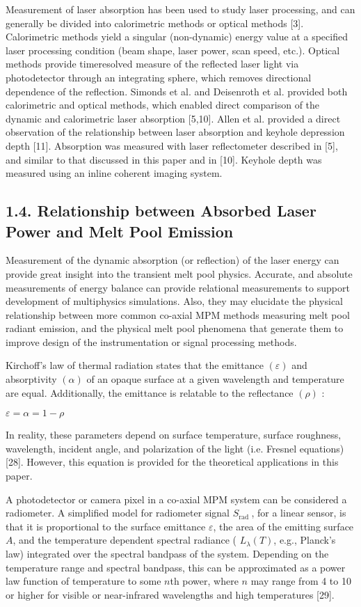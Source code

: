 \documentclass[10pt]{article}
\begin{document}
Measurement of laser absorption has been used to study laser processing, and can generally be divided into calorimetric methods or optical methods [3]. Calorimetric methods yield a singular (non-dynamic) energy value at a specified laser processing condition (beam shape, laser power, scan speed, etc.). Optical methods provide timeresolved measure of the reflected laser light via photodetector through an integrating sphere, which removes directional dependence of the reflection. Simonds et al. and Deisenroth et al. provided both calorimetric and optical methods, which enabled direct comparison of the dynamic and calorimetric laser absorption [5,10]. Allen et al. provided a direct observation of the relationship between laser absorption and keyhole depression depth [11]. Absorption was measured with laser reflectometer described in [5], and similar to that discussed in this paper and in [10]. Keyhole depth was measured using an inline coherent imaging system.

\subsection*{1.4. Relationship between Absorbed Laser Power and Melt Pool Emission}
Measurement of the dynamic absorption (or reflection) of the laser energy can provide great insight into the transient melt pool physics. Accurate, and absolute measurements of energy balance can provide relational measurements to support development of multiphysics simulations. Also, they may elucidate the physical relationship between more common co-axial MPM methods measuring melt pool radiant emission, and the physical melt pool phenomena that generate them to improve design of the instrumentation or signal processing methods.

Kirchoff's law of thermal radiation states that the emittance $(\varepsilon)$ and absorptivity $(\alpha)$ of an opaque surface at a given wavelength and temperature are equal. Additionally, the emittance is relatable to the reflectance $(\rho)$ :

$\varepsilon=\alpha=1-\rho$

In reality, these parameters depend on surface temperature, surface roughness, wavelength, incident angle, and polarization of the light (i.e. Fresnel equations) [28]. However, this equation is provided for the theoretical applications in this paper.

A photodetector or camera pixel in a co-axial MPM system can be considered a radiometer. A simplified model for radiometer signal $S_{\text {rad }}$, for a linear sensor, is that it is proportional to the surface emittance $\varepsilon$, the area of the emitting surface $A$, and the temperature dependent spectral radiance ( $L_{\lambda}(T)$, e.g., Planck's law) integrated over the spectral bandpass of the system. Depending on the temperature range and spectral bandpass, this can be approximated as a power law function of temperature to some $n$th power, where $n$ may range from 4 to 10 or higher for visible or near-infrared wavelengths and high temperatures [29].
\end{document}
